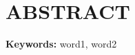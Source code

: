 %
%
% 
		\chapter*{ABSTRACT}
		\begin{singlespace}
			\setlength{\parindent}{0.5in}
			\setlength{\parskip}{0pt}       
			\lipsum[10]
			
			\vspace{1.5\baselineskip}
			
			\noindent \textbf{Keywords:} word1, word2
		\end{singlespace}
%
